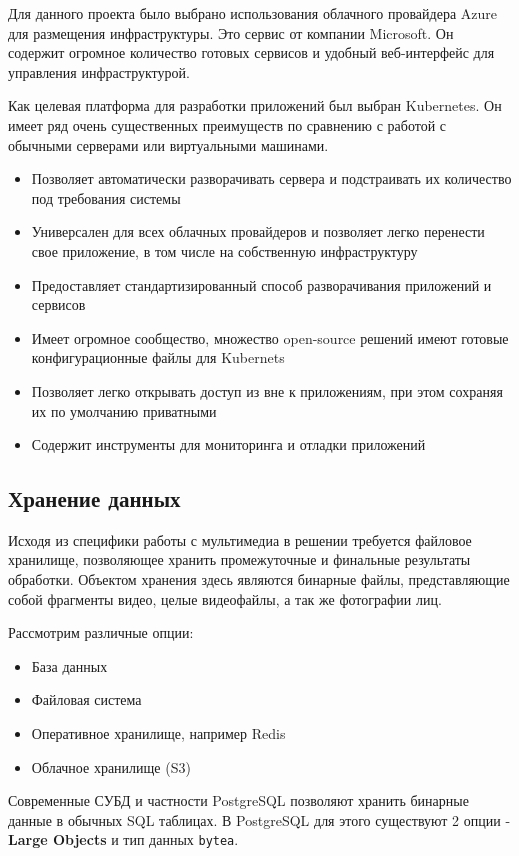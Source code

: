 Для данного проекта было выбрано использования облачного провайдера Azure для размещения инфраструктуры. Это сервис от компании Microsoft. Он содержит огромное количество готовых сервисов и удобный веб-интерфейс для управления инфраструктурой.

Как целевая платформа для разработки приложений был выбран Kubernetes. Он имеет ряд очень существенных преимуществ по сравнению с работой с обычными серверами или виртуальными машинами.

\begin{itemize}
	\item Позволяет автоматически разворачивать сервера и подстраивать их количество под требования системы
	\item Универсален для всех облачных провайдеров и позволяет легко перенести свое приложение, в том числе на собственную инфраструктуру
	\item Предоставляет стандартизированный способ разворачивания приложений и сервисов
	\item Имеет огромное сообщество, множество open-source решений имеют готовые конфигурационные файлы для Kubernets
	\item Позволяет легко открывать доступ из вне к приложениям, при этом сохраняя их по умолчанию приватными
	\item Содержит инструменты для мониторинга и отладки приложений
\end{itemize}

\subsection{Хранение данных}

Исходя из специфики работы с мультимедиа в решении требуется файловое хранилище, позволяющее хранить промежуточные и финальные результаты обработки. Объектом хранения здесь являются бинарные файлы, представляющие собой фрагменты видео, целые видеофайлы, а так же фотографии лиц.

Рассмотрим различные опции:

\begin{itemize}
	\item База данных
	\item Файловая система
	\item Оперативное хранилище, например Redis
	\item Облачное хранилище (S3)
\end{itemize}

Современные СУБД и частности PostgreSQL позволяют хранить бинарные данные в обычных SQL таблицах. В PostgreSQL для этого существуют 2 опции - \textbf{Large Objects} и тип данных \texttt{bytea}.

